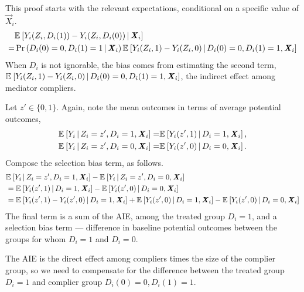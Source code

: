 This proof starts with the relevant expectations, conditional on a specific value of $\vec X_i$.
\begin{align*}
    &\mathbb{E}_{} \left[  Y_i(Z_i, D_i(1)) - Y_i(Z_i, D_i(0)) \, \middle\vert \, \boldsymbol{\mathit{X}}_i \right] \\
    =& \Pr\left( D_i(0) = 0, D_i(1) = 1 \, \middle\vert \, \boldsymbol{\mathit{X}}_i \right)
        \mathbb{E}_{} \left[  Y_i(Z_i, 1) - Y_i(Z_i, 0) \, \middle\vert \, D_i(0) = 0, D_i(1) = 1, \boldsymbol{\mathit{X}}_i \right]
\end{align*}
When $D_i$ is not ignorable, the bias comes from estimating the second term,
\\ $\mathbb{E}_{} \left[  Y_i(Z_i, 1) - Y_i(Z_i, 0) \, \middle\vert \, D_i(0) = 0, D_i(1) = 1, \boldsymbol{\mathit{X}}_i \right]$, the indirect effect among mediator compliers.

Let $z' \in \{ 0, 1 \}$.
Again, note the mean outcomes in terms of average potential outcomes,
\begin{align*}
    \mathbb{E}_{} \left[ Y_i \, \middle\vert \, Z_i = z', D_i = 1, \boldsymbol{\mathit{X}}_i \right]
    =& \mathbb{E}_{} \left[ Y_i(z', 1) \, \middle\vert \, D_i = 1, \boldsymbol{\mathit{X}}_i \right], \\
    \mathbb{E}_{} \left[ Y_i \, \middle\vert \, Z_i = z', D_i = 0, \boldsymbol{\mathit{X}}_i \right]
    =& \mathbb{E}_{} \left[ Y_i(z', 0) \, \middle\vert \, D_i = 0, \boldsymbol{\mathit{X}}_i \right].
\end{align*}
Compose the selection bias term, as follows.
\begin{align*}
    & \mathbb{E}_{} \left[ Y_i \, \middle\vert \, Z_i = z', D_i = 1, \boldsymbol{\mathit{X}}_i \right]
    - \mathbb{E}_{} \left[ Y_i \, \middle\vert \, Z_i = z', D_i = 0, \boldsymbol{\mathit{X}}_i \right] \\
    &= \mathbb{E}_{} \left[ Y_i(z', 1) \, \middle\vert \, D_i = 1, \boldsymbol{\mathit{X}}_i \right]
        - \mathbb{E}_{} \left[ Y_i(z', 0) \, \middle\vert \, D_i = 0, \boldsymbol{\mathit{X}}_i \right] \\
    &= \mathbb{E}_{} \left[ Y_i(z', 1) - Y_i(z', 0) \, \middle\vert \, D_i = 1, \boldsymbol{\mathit{X}}_i \right]
    + \mathbb{E}_{} \left[ Y_i(z', 0) \, \middle\vert \, D_i = 1, \boldsymbol{\mathit{X}}_i \right] - \mathbb{E}_{} \left[ Y_i(z', 0) \, \middle\vert \, D_i = 0, \boldsymbol{\mathit{X}}_i \right]
\end{align*}
The final term is a sum of the AIE, among the treated group $D_i = 1$, and a selection bias term --- difference in baseline potential outcomes between the groups for whom $D_i = 1$ and $D_i = 0$.

The AIE is the direct effect among compliers times the size of the complier group, so we need to compensate for the difference between the treated group $D_i = 1$ and complier group $D_i(0) = 0, D_i(1) = 1$.

